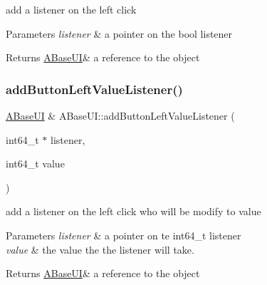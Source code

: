 add a listener on the left click 


\begin{DoxyParams}{Parameters}
{\em listener} & a pointer on the bool listener \\
\hline
\end{DoxyParams}
\begin{DoxyReturn}{Returns}
\hyperlink{class_a_base_u_i}{A\+Base\+UI}\& a reference to the object 
\end{DoxyReturn}
\mbox{\label{class_a_base_u_i_a9d351ded131d2d5ef546616a166ace59}} 
\subsubsection{\texorpdfstring{add\+Button\+Left\+Value\+Listener()}{addButtonLeftValueListener()}}
{\footnotesize\ttfamily \hyperlink{class_a_base_u_i}{A\+Base\+UI} \& A\+Base\+U\+I\+::add\+Button\+Left\+Value\+Listener (\begin{DoxyParamCaption}\item[{int64\+\_\+t $\ast$}]{listener,  }\item[{int64\+\_\+t}]{value }\end{DoxyParamCaption})\hspace{0.3cm}{\ttfamily [virtual]}}



add a listener on the left click who will be modify to value 


\begin{DoxyParams}{Parameters}
{\em listener} & a pointer on te int64\+\_\+t listener \\
\hline
{\em value} & the value the the listener will take. \\
\hline
\end{DoxyParams}
\begin{DoxyReturn}{Returns}
\hyperlink{class_a_base_u_i}{A\+Base\+UI}\& a reference to the object 
\end{DoxyReturn}
\mbox{\label{class_a_base_u_i_a63ab2419d2aa942726854770a54ca15f}} 
